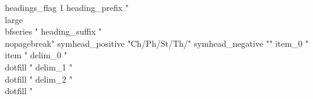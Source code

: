 headings_flag 1
heading_prefix "{\\large\\bfseries "
heading_suffix "}\\nopagebreak\n"
symhead_positive "Ch/Ph/St/Th/"
symhead_negative ""
item_0 "\n \\item "
delim_0 " \\dotfill "
delim_1 " \\dotfill "
delim_2 " \\dotfill "